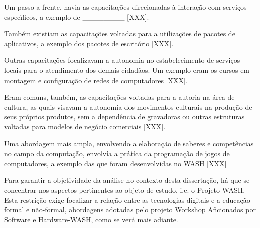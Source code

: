 \documentclass[
12pt,		%
openright,	%
twoside,  %
a4paper,			%
chapter=TITLE,		%
english,			%
french,				%
spanish,			%
brazil				%
]{USPSC-classe/USPSC_RedarTex}
\begin{document}
Um passo a frente, havia as capacita\c{c}\~oes direcionadas \`a intera\c{c}\~ao com servi\c{c}os espec\'{\i}ficos, a exemplo de \_\_\_\_\_\_\_\_ [XXX].










Tamb\'em existiam as capacita\c{c}\~oes voltadas para a utiliza\c{c}\~oes de pacotes de aplicativos, a exemplo dos pacotes de escrit\'orio [XXX].










Outras capacita\c{c}\~oes focalizavam a autonomia no estabelecimento de servi\c{c}os locais para o atendimento dos demais cidad\~aos. Um exemplo eram os cursos em montagem e configura\c{c}\~ao de redes de computadores [XXX].










Eram comuns, tamb\'em, as capacita\c{c}\~oes voltadas para a autoria na \'area de cultura, as quais visavam a autonomia dos movimentos culturais na produ\c{c}\~ao de seus pr\'oprios produtos, sem a depend\^encia de gravadoras ou outras estruturas voltadas para modelos de neg\'ocio comerciais [XXX].










Uma abordagem mais ampla, envolvendo a elabora\c{c}\~ao de saberes e compet\^encias no campo da computa\c{c}\~ao, envolvia a pr\'atica da programa\c{c}\~ao de jogos de computadores, a exemplo das que foram desenvolvidas no WASH [XXX]










Para garantir a objetividade da an\'alise no contexto desta disserta\c{c}\~ao, h\'a que se concentrar nos aspectos pertinentes ao objeto de estudo, i.e. o Projeto WASH. Esta restri\c{c}\~ao exige focalizar a rela\c{c}\~ao entre as tecnologias digitais e a educa\c{c}\~ao formal e n\~ao-formal, abordagens adotadas pelo projeto Workshop Aficionados por Software e Hardware-WASH, como se ver\'a mais adiante.
\end{document}
